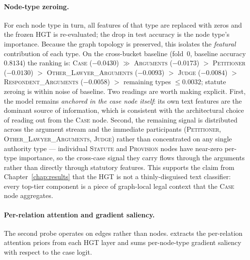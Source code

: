 \paragraph{Node-type zeroing.}
For each node type in turn, all features of that type are replaced
with zeros and the frozen HGT is re-evaluated; the drop in test
accuracy is the node type's importance.  Because the graph topology
is preserved, this isolates the \emph{featural} contribution of each
type.  On the cross-bucket baseline (fold~0, baseline accuracy
$0.8134$) the ranking is:
\textsc{Case} ($-0.0430$) $\gg$
\textsc{Arguments} ($-0.0173$) $>$
\textsc{Petitioner} ($-0.0130$) $>$
\textsc{Other\_Lawyer\_Arguments} ($-0.0093$) $>$
\textsc{Judge} ($-0.0084$) $>$
\textsc{Respondent\_Arguments} ($-0.0058$) $>$ remaining types
$\leq\!0.0032$; statute zeroing is within noise of baseline.
Two readings are worth making explicit.  First, the model remains
\emph{anchored in the case node itself}: its own text features are
the dominant source of information, which is consistent with the
architectural choice of reading out from the \textsc{Case} node.
Second, the remaining signal is distributed across the argument
stream and the immediate participants (\textsc{Petitioner},
\textsc{Other\_Lawyer\_Arguments}, \textsc{Judge}) rather than
concentrated on any single authority type --- individual
\textsc{Statute} and \textsc{Provision} nodes have near-zero
per-type importance, so the cross-case signal they carry flows
through the arguments rather than directly through statutory
features.  This supports the claim from Chapter~\ref{chap:results}
that the HGT is not a thinly-disguised text classifier: every
top-tier component is a piece of graph-local legal context that the
\textsc{Case} node aggregates.

\paragraph{Per-relation attention and gradient saliency.}
The second probe operates on edges rather than nodes.
 extracts the per-relation attention
priors from each HGT layer and sums per-node-type gradient saliency
with respect to the case logit.

